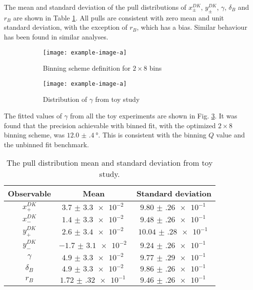 \documentclass[12pt, a4paper, notitlepage, onecolumn]{article}
\numberwithin{equation}{section}
\begin{document}
The mean and standard deviation of the pull distributions of $x_\pm^{DK}$, $y_\pm^{DK}$, $\gamma$, $\delta_B$ and $r_B$ are shown in Table \ref{table_pull_study}. All pulls are consistent with zero mean and unit standard deviation, with the exception of $r_B$, which has a bias. Similar behaviour has been found in similar analyses.

\begin{figure}[H] 
  \centering
  \begin{subfigure}{0.5\textwidth}
    \centering
    \texttt{[image: example-image-a]}
    \caption{Binning scheme definition for $2\times 8$ bins}
    \label{fig_binning_scheme}
  \end{subfigure}%
  \begin{subfigure}{0.5\textwidth}
    \centering
    \texttt{[image: example-image-a]}
    \caption{Distribution of $\gamma$ from toy study}
    \label{fig_gamma_pull_study}
  \end{subfigure}
  \caption{}
\end{figure}

The fitted values of $\gamma$ from all the toy experiments are shown in Fig. \ref{fig_gamma_pull_study}. It was found that the precision achievable with binned fit, with the optimized $2\times 8$ binning scheme, was $\SI{12.0(4)}{\degree}$. This is consistent with the binning $Q$ value and the unbinned fit benchmark.

\begin{table}[H]
  \centering
  \caption{The pull distribution mean and standard deviation from toy study.}
  \label{table_pull_study}
  \begin{tabular}{ccc} 
    \toprule
    Observable & Mean                 & Standard deviation \\
    \toprule
    $x_+^{DK}$ & $\SI{3.7(33)e-2}{}$  & $\SI{9.80(26)e-1}{}$ \\
    $x_-^{DK}$ & $\SI{1.4(33)e-2}{}$  & $\SI{9.48(26)e-1}{}$ \\
    $y_+^{DK}$ & $\SI{2.6(34)e-2}{}$  & $\SI{10.04(28)e-1}{}$ \\
    $y_-^{DK}$ & $\SI{-1.7(31)e-2}{}$ & $\SI{9.24(26)e-1}{}$ \\
    $\gamma$   & $\SI{4.9(33)e-2}{}$ & $\SI{9.77(29)e-1}{}$ \\
    $\delta_B$ & $\SI{4.9(33)e-2}{}$ & $\SI{9.86(26)e-1}{}$ \\
    $r_B$      & $\SI{1.72(32)e-1}{}$ & $\SI{9.46(26)e-1}{}$ \\
    \bottomrule
  \end{tabular}
\end{table}
\end{document}
